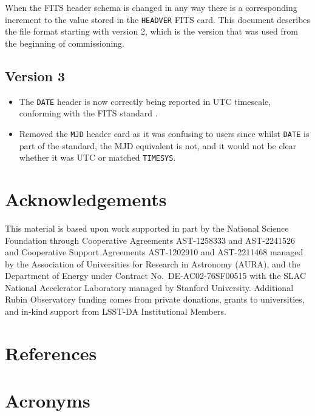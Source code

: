 \documentclass[OPS,lsstdraft,authoryear,toc]{lsstdoc}
\begin{document}
When the FITS header schema is changed in any way there is a corresponding increment to the value stored in the \texttt{HEADVER} FITS card.
This document describes the file format starting with version 2, which is the version that was used from the beginning of commissioning.

\subsection{Version 3}

\begin{itemize}
\item The \texttt{DATE} header is now correctly being reported in UTC timescale, conforming with the FITS standard \citep{2010A&A...524A..42P}.
\item Removed the \texttt{MJD} header card as it was confusing to users since whilst \texttt{DATE} is part of the standard, the MJD equivalent is not, and it would not be clear whether it was UTC or matched \texttt{TIMESYS}.
\end{itemize}

\section{Acknowledgements}

This material is based upon work supported in part by the National Science Foundation through Cooperative Agreements AST-1258333 and AST-2241526 and Cooperative Support Agreements AST-1202910 and AST-2211468 managed by the Association of Universities for Research in Astronomy (AURA), and the Department of Energy under Contract No.\ DE-AC02-76SF00515 with the SLAC National Accelerator Laboratory managed by Stanford University.
Additional Rubin Observatory funding comes from private donations, grants to universities, and in-kind support from LSST-DA Institutional Members.

\section{References} \label{sec:bib}
\renewcommand{\refname}{} %


\section{Acronyms} \label{sec:acronyms}

\end{document}
